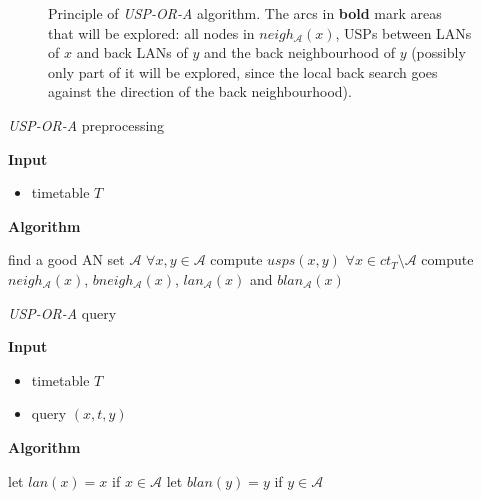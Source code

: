 	\begin{figure}[h!]
		\begin{center}
		\end{center}
		\caption{\label{fig:uspora} Principle of \textit{USP-OR-A} algorithm. The arcs in \textbf{bold} mark areas that will be explored: all nodes in $neigh_{\mathcal{A}}(x)$, USPs between LANs of $x$ and back LANs of $y$ and the back neighbourhood of $y$ (possibly only part of it will be explored, since the local back search goes against the direction of the back neighbourhood).}
	\end{figure}	
	
	\color{algcolor}
	\begin{algorithm}[H]
		\color{inalgcolor}
		\caption{\textit{USP-OR-A} preprocessing}
		\label{alg:uspora-prepro}
		\textbf{Input} 
		\begin{itemize}
			\item timetable $T$
		\end{itemize}
		\textbf{Algorithm}
		\begin{algorithmic}[1]
			\STATE find a good AN set $\mathcal{A}$
			\STATE $\forall x, y \in \mathcal{A}$ compute $usps(x, y)$
			\STATE $\forall x \in ct_{T} \setminus \mathcal{A}$ compute $neigh_{\mathcal{A}}(x)$, $bneigh_{\mathcal{A}}(x)$, $lan_{\mathcal{A}}(x)$ and $blan_{\mathcal{A}}(x)$
		\end{algorithmic}
	\end{algorithm}
	\color{black}
	
	\color{algcolor}
	\begin{algorithm}[H]
		\color{inalgcolor}
		\caption{\textit{USP-OR-A} query}
		\label{alg:uspora-query}
		\textbf{Input} 
		\begin{itemize}
			\item timetable $T$
			\item query $(x, t, y)$
		\end{itemize}
		\textbf{Algorithm}
		\begin{algorithmic}[1]
			\STATE let $lan(x) = x$ if $x \in \mathcal{A}$
			\STATE let $blan(y) = y$ if $y \in \mathcal{A}$
		\end{algorithmic}
	\end{algorithm}
	
